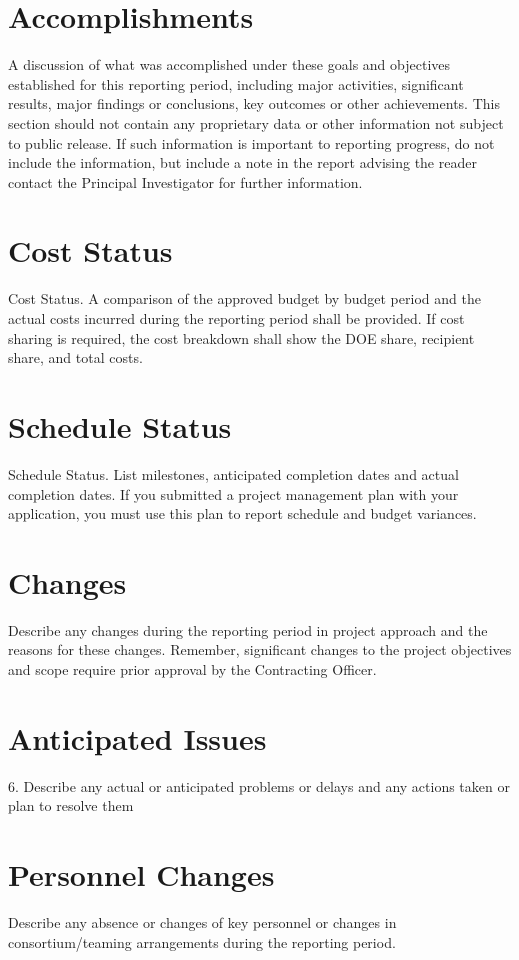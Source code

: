 \documentclass[12pt]{article}
\begin{document}
\section{Accomplishments}
\label{sect::accomplishments}
A discussion of what was accomplished under these goals and objectives established for this reporting period, including major activities, significant results, major findings or conclusions, key outcomes or other achievements.  This section should not contain any proprietary data or other information not subject to public release.  If such information is important to reporting progress, do not include the information, but include a note in the report advising the reader contact the Principal Investigator for further information. 

\section{Cost Status}
\label{sect::cost}
Cost Status.  A comparison of the approved budget by budget period and the actual costs incurred during the reporting period shall be provided.  If cost sharing is required, the cost breakdown shall show the DOE share, recipient share, and total costs. 

\section{Schedule Status}
\label{sect::schedule}
Schedule Status.  List milestones, anticipated completion dates and actual completion dates.  If you submitted a project management plan with your application, you must use this plan to report schedule and budget variances.   

\section{Changes}
\label{sect::changes}
Describe any changes during the reporting period in project approach and the reasons for these changes.  Remember, significant changes to the project objectives and scope require prior approval by the Contracting Officer. 

\section{Anticipated Issues}
\label{sect::schedule}
6.	Describe any actual or anticipated problems or delays and any actions taken or plan to resolve them 

\section{Personnel Changes}
\label{sect::personnel}
Describe any absence or changes of key personnel or changes in consortium/teaming arrangements during the reporting period. 
\end{document}
